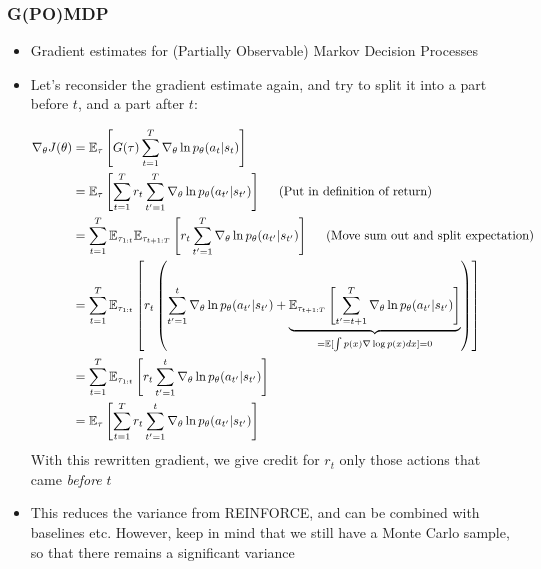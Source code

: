 \subsubsection{G(PO)MDP}
\begin{itemize}
	\item Gradient estimates for (Partially Observable) Markov Decision Processes
	\item Let's reconsider the gradient estimate again, and try to split it into a part before $t$, and a part after $t$:
	
	\begin{equation*}
		\begin{split}
			\nabla_{\theta}J(\theta) & =  \mathbb{E}_{\tau}\left[G(\tau)\sum_{t=1}^{T}\nabla_{\theta} \ln p_{\theta}(a_t|s_t)\right]\\
			& = \mathbb{E}_{\tau}\left[\sum_{t=1}^{T} r_t \sum_{t'=1}^{T}\nabla_{\theta} \ln p_{\theta}(a_{t'}|s_{t'})\right]\hspace{5mm}\text{(Put in definition of return)}\\
			& = \sum_{t=1}^{T} \mathbb{E}_{\tau_{1:t}}\mathbb{E}_{\tau_{t+1:T}}\left[r_t \sum_{t'=1}^{T}\nabla_{\theta} \ln p_{\theta}(a_{t'}|s_{t'})\right]\hspace{5mm}\text{(Move sum out and split expectation)}\\
			& = \sum_{t=1}^{T} \mathbb{E}_{\tau_{1:t}}\left[r_t \left(\sum_{t'=1}^{t}\nabla_{\theta} \ln p_{\theta}(a_{t'}|s_{t'}) + \underbrace{\mathbb{E}_{\tau_{t+1:T}}\left[\sum_{t'=t+1}^{T}\nabla_{\theta} \ln p_{\theta}(a_{t'}|s_{t'})\right]}_{=\mathbb{E}[\int p(x)\nabla\log p(x)dx]=0}\right)\right]\\
			& = \sum_{t=1}^{T} \mathbb{E}_{\tau_{1:t}}\left[r_t \sum_{t'=1}^{t}\nabla_{\theta} \ln p_{\theta}(a_{t'}|s_{t'}) \right]\\
			& = \mathbb{E}_{\tau}\left[\sum_{t=1}^{T}  r_t \sum_{t'=1}^{t}\nabla_{\theta} \ln p_{\theta}(a_{t'}|s_{t'}) \right]
		\end{split}
	\end{equation*}
	With this rewritten gradient, we give credit for $r_t$ only those actions that came \textit{before} $t$
	\item This reduces the variance from REINFORCE, and can be combined with baselines etc. However, keep in mind that we still have a Monte Carlo sample, so that there remains a significant variance
\end{itemize}
